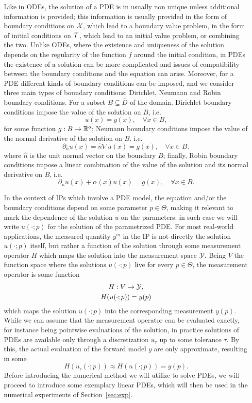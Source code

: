 Like in ODEs, the solution of a PDE is in usually non unique unless additional information is provided; this information is usually provided in the form of boundary conditions on $\mathcal X$, which lead to a boundary value problem, in the form of initial conditions on $\mathcal T$, which lead to an initial value problem, or combining the two.
Unlike ODEs, where the existence and uniqueness of the solution depends on the regularity of the function $f$ around the initial condition, in PDEs the existence of a solution can be more complicated and issues of compatibility between the boundary conditions and the equation can arise.
Moreover, for a PDE different kinds of boundary conditions can be imposed, and we consider three main types of boundary conditions: Dirichlet, Neumann and Robin boundary conditions.
For a subset $B \subseteq \bar D$ of the domain, Dirichlet boundary conditions impose the value of the solution on $B$, i.e.
\[
    u(x) = g(x), \quad \forall x \in B,
\]
for some function $g: B \rightarrow \mathbb{R}^o$;
Neumann boundary conditions impose the value of the normal derivative of the solution on $B$, i.e.
\[
    \partial_{\hat{n}} u(x)= \hat n \nabla u(x) = g(x), \quad \forall x \in B,
\]
where $\hat n$ is the unit normal vector on the boundary $B$; 
finally, Robin boundary conditions impose a linear combination of the value of the solution and its normal derivative on $B$, i.e.
\[
    \partial_{\hat{n}} u(x) + \alpha(x) u(x) = g(x), \quad \forall x \in B.
\]

In the context of IPs which involve a PDE model, the equation and/or the boundary conditions depend on some parameter $p \in \Theta$, making it relevant to mark the dependence of the solution $u$ on the parameters: in such case we will write $u(\cdot;p)$ for the solution of the parametrized PDE.
For most real-world applications, the measured quantity $y^m$ in the IP is not directly the solution $u(\cdot;p)$ itself, but rather a function of the solution through some measurement operator $H$ which maps the solution into the measurement space $\mathcal Y$.
Being $V$ the function space where the solutions $u(\cdot;p)$ live for every $p \in \Theta$, the measurement operator is some function 
\begin{equation} \label{eq:measurement-operator}
    \begin{gathered}
        H : V \rightarrow \mathcal Y, \\
        H(u(\cdot;p)) = y(p)
    \end{gathered}
\end{equation}
which maps the solution $u(\cdot;p)$ into the corresponding measurement $y(p)$.
While we can assume that the measurement operator can be evaluated exactly, for instance being pointwise evaluations of the solution, in practice solutions of PDEs are available only through a discretization $u_\tau$ up to some tolerance $\tau$.
By this, the actual evaluation of the forward model $y$ are only approximate, resulting in some
\[
    H(u_\tau(\cdot;p)) \approx H(u(\cdot;p)) = y(p) .
\]
Before introducing the numerical method we will utilize to solve PDEs, we will proceed to introduce some exemplary linear PDEs, which will then be used in the numerical experiments of Section~\ref{sec:exp}.\medskip

